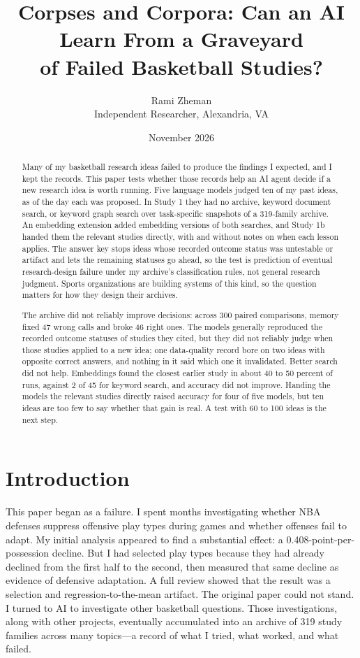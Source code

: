 \documentclass[11pt]{article}
\title{Corpses and Corpora: Can an AI Learn From a Graveyard\\
of Failed Basketball Studies?}
\author{Rami Zheman \\ Independent Researcher, Alexandria, VA}
\date{November 2026}
\begin{document}
\maketitle

\begin{abstract}
Many of my basketball research ideas failed to produce the findings I expected, and I kept the records. This paper tests whether those records help an AI agent decide if a new research idea is worth running. Five language models judged ten of my past ideas, as of the day each was proposed. In Study 1 they had no archive, keyword document search, or keyword graph search over task-specific snapshots of a 319-family archive. An embedding extension added embedding versions of both searches, and Study 1b handed them the relevant studies directly, with and without notes on when each lesson applies. The answer key stops ideas whose recorded outcome status was untestable or artifact and lets the remaining statuses go ahead, so the test is prediction of eventual research-design failure under my archive's classification rules, not general research judgment. Sports organizations are building systems of this kind, so the question matters for how they design their archives.

The archive did not reliably improve decisions: across 300 paired comparisons, memory fixed 47 wrong calls and broke 46 right ones. The models generally reproduced the recorded outcome statuses of studies they cited, but they did not reliably judge when those studies applied to a new idea; one data-quality record bore on two ideas with opposite correct answers, and nothing in it said which one it invalidated. Better search did not help. Embeddings found the closest earlier study in about 40 to 50 percent of runs, against 2 of 45 for keyword search, and accuracy did not improve. Handing the models the relevant studies directly raised accuracy for four of five models, but ten ideas are too few to say whether that gain is real. A test with 60 to 100 ideas is the next step.
\end{abstract}

\section{Introduction}
\label{sec:intro}

This paper began as a failure. I spent months investigating whether NBA defenses suppress offensive play types during games and whether offenses fail to adapt. My initial analysis appeared to find a substantial effect: a 0.408-point-per-possession decline. But I had selected play types because they had already declined from the first half to the second, then measured that same decline as evidence of defensive adaptation. A full review showed that the result was a selection and regression-to-the-mean artifact. The original paper could not stand. I turned to AI to investigate other basketball questions. Those investigations, along with other projects, eventually accumulated into an archive of 319 study families across many topics---a record of what I tried, what worked, and what failed.
\end{document}
